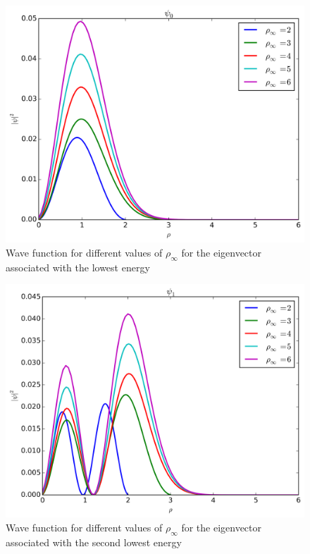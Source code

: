 \documentclass[11pt,a4paper,english,final]{article}
\numberwithin{equation}{section}
\newcommand{\figurewidth}{.85\textwidth}
\begin{document}
\begin{figure}
\centering
\includegraphics[width=\figurewidth]{../results/psi_inf_compare_psi0.png}
\caption{Wave function for different values of $\rho_\infty$ for
the eigenvector associated with the lowest energy}
\label{fig:psi0rho}
\end{figure}

\begin{figure}
\centering
\includegraphics[width=\figurewidth]{../results/psi_inf_compare_psi1.png}
\caption{Wave function for different values of $\rho_\infty$ for
the eigenvector associated with the second lowest energy}
\label{fig:psi1rho}
\end{figure}
\end{document}
